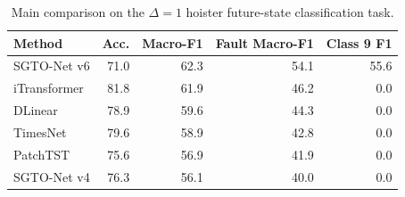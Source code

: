 \begin{table}[t]
\centering
\caption{Main comparison on the $\Delta=1$ hoister future-state classification task.}
\label{tab:main_d1}
\begin{tabular}{lrrrr}
\toprule
Method & Acc. & Macro-F1 & Fault Macro-F1 & Class 9 F1 \\
\midrule
SGTO-Net v6 & 71.0 & 62.3 & 54.1 & 55.6 \\
iTransformer & 81.8 & 61.9 & 46.2 & 0.0 \\
DLinear & 78.9 & 59.6 & 44.3 & 0.0 \\
TimesNet & 79.6 & 58.9 & 42.8 & 0.0 \\
PatchTST & 75.6 & 56.9 & 41.9 & 0.0 \\
SGTO-Net v4 & 76.3 & 56.1 & 40.0 & 0.0 \\
\bottomrule
\end{tabular}
\end{table}
